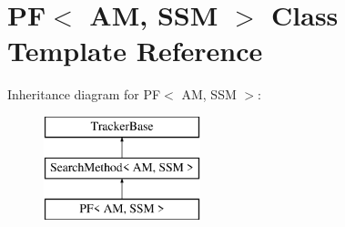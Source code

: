 \hypertarget{classPF}{\section{P\-F$<$ A\-M, S\-S\-M $>$ Class Template Reference}
\label{classPF}
}
Inheritance diagram for P\-F$<$ A\-M, S\-S\-M $>$\-:\begin{figure}[H]
\begin{center}
\leavevmode
\includegraphics[height=3.000000cm]{classPF}
\end{center}
\end{figure}
